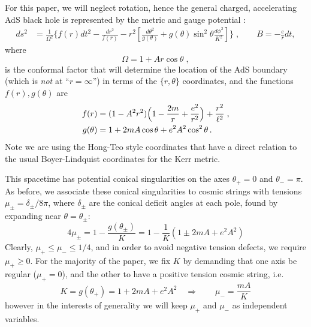 \documentclass[
twoside,openright,frontopenright]{dmathesis}
\begin{document}
For this paper, we will neglect rotation, hence the general charged,
accelerating AdS black hole is represented by the metric and gauge potential
\cite{Griffiths:2005qp}:
\begin{equation}
\begin{aligned}
ds^2&=\frac{1}{\Omega^2}\Biggl\{ 
f(r) dt^2
-\frac{dr^2}{f(r)} - r^2 \left[ \frac{d\theta^2}{g(\theta)} 
+ g(\theta)\sin^2\theta \frac{d\phi^2}{K^2}\right]\Biggr\}
\; , \qquad
{B}= -\frac{e}{r} dt,
\end{aligned}
\label{dimlessmtrc}
\end{equation}
where
\begin{equation}
\Omega=1+A r \cos\theta\;,
\end{equation}
is the conformal factor that will determine the location of the AdS
boundary (which is {\it not} at ``$r=\infty$'') in terms of the 
$\{r,\theta\}$ coordinates, and the functions $f(r), g(\theta)$ are
\begin{equation}
\begin{aligned}
f(r)&=(1-A^2r^2)\Bigl(1-\frac{2 m}{r}+\frac{e^2}{r^2}\Bigr)
+\frac{r^2}{\ell^2} \;,\\
g(\theta)&=1+2mA \cos\theta+ e^2A^2 \cos^2\theta\,.
\end{aligned}
\label{fandg}
\end{equation}
Note we are using the Hong-Teo \cite{Hong:2003gx} style coordinates
that have a direct relation to the usual Boyer-Lindquist coordinates
for the Kerr metric.

This spacetime has potential conical singularities on the axes $\theta_+=0$
and $\theta_-=\pi$. As before, we associate these conical singularities
to cosmic strings with tensions $\mu_\pm = \delta_\pm/8\pi$, 
where $\delta_\pm$ are the conical deficit angles at each pole,
found by expanding near $\theta=\theta_\pm$:
\begin{equation}
4\mu_\pm =  1 - \frac{g(\theta_\pm)}{K}
= 1 - \frac1K \left (1 \pm 2mA + e^2A^2 \right)
\label{tensions}
\end{equation}
Clearly, $\mu_+ \leq \mu_- \leq 1/4$, and in order to avoid negative tension
defects, we require $\mu_+ \geq 0$. For the majority of the paper, 
we fix $K$ by demanding that one axis be regular ($\mu_+=0$), and the 
other to have a positive tension cosmic string, i.e.
\begin{equation}
K = g(\theta_+) = 1 + 2mA + e^2A^2\quad \Rightarrow \qquad
\mu_-= \frac{mA}{K}
\end{equation}
however in the interests of generality we will keep $\mu_+$ and $\mu_-$ as
independent variables.
\end{document}
